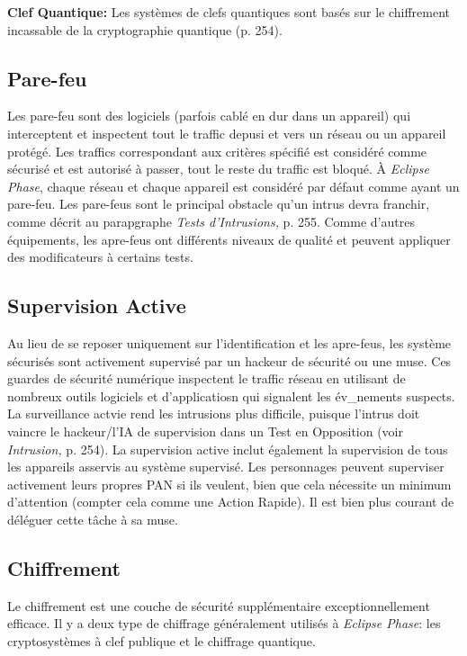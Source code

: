 \textbf{Clef Quantique:} Les systèmes de clefs quantiques sont basés sur le chiffrement incassable de la cryptographie quantique (p. 254). 

\subsection{Pare-feu} 

Les pare-feu sont des logiciels (parfois cablé en dur dans un appareil) qui interceptent et inspectent tout le traffic depusi et vers un réseau ou un appareil protégé. Les traffics correspondant aux critères spécifié est considéré comme sécurisé et est autorisé à passer, tout le reste du traffic est bloqué. À \textit{Eclipse Phase}, chaque réseau et chaque appareil est considéré par défaut comme ayant un pare-feu. Les pare-feus sont le principal obstacle qu'un intrus devra franchir, comme décrit au parapgraphe \textit{Tests d'Intrusions,} p. 255. Comme d'autres équipements, les apre-feus ont différents niveaux de qualité et peuvent appliquer des modificateurs à certains tests. 

\subsection{Supervision Active} 

Au lieu de se reposer uniquement sur l'identification et les apre-feus, les système sécurisés sont activement supervisé par un hackeur de sécurité ou une muse. Ces guardes de sécurité numérique inspectent le traffic réseau en utilisant de nombreux outils logiciels et d'applicatiosn qui signalent les év_nements suspects. La surveillance actvie rend les intrusions plus difficile, puisque l'intrus doit vaincre le hackeur/l'IA de supervision dans un Test en Opposition (voir \textit{Intrusion,} p. 254). La supervision active inclut également la supervision de tous les appareils asservis au système supervisé. Les personnages peuvent superviser activement leurs propres PAN si ils veulent, bien que cela nécessite un minimum d'attention (compter cela comme une Action Rapide). Il est bien plus courant de déléguer cette tâche à sa muse. 

\subsection{Chiffrement} 

Le chiffrement est une couche de sécurité supplémentaire exceptionnellement efficace. Il y a deux type de chiffrage généralement utilisés à \textit{Eclipse Phase}: les cryptosystèmes à clef publique et le chiffrage quantique. 

